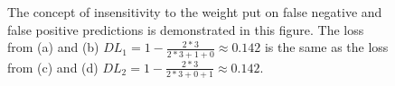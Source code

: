 \begin{figure}[H]
  \caption[Insensitivity to FP / FN weight \ac{DL}]{The concept of insensitivity to the weight put on false negative and false positive predictions is demonstrated in this figure. The loss from (a) and (b) $DL_1 = 1-\frac{2*3}{2*3+1+0}\approx 0.142$ is the same as the loss from (c) and (d) $DL_2 = 1-\frac{2*3}{2*3+0+1}\approx 0.142$.}
  \label{dice_limit_4}
\end{figure}

\newpage